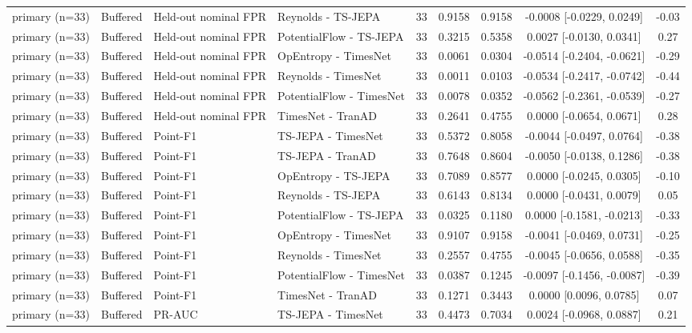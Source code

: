 \begin{table}[t]
\begin{tabular}{@{}llllccccc@{}}
primary (n=33) & Buffered & Held-out nominal FPR & Reynolds - TS-JEPA & 33 & 0.9158 & 0.9158 & -0.0008 [-0.0229, 0.0249] & -0.03 \\
primary (n=33) & Buffered & Held-out nominal FPR & PotentialFlow - TS-JEPA & 33 & 0.3215 & 0.5358 & 0.0027 [-0.0130, 0.0341] & 0.27 \\
primary (n=33) & Buffered & Held-out nominal FPR & OpEntropy - TimesNet & 33 & 0.0061 & 0.0304 & -0.0514 [-0.2404, -0.0621] & -0.29 \\
primary (n=33) & Buffered & Held-out nominal FPR & Reynolds - TimesNet & 33 & 0.0011 & 0.0103 & -0.0534 [-0.2417, -0.0742] & -0.44 \\
primary (n=33) & Buffered & Held-out nominal FPR & PotentialFlow - TimesNet & 33 & 0.0078 & 0.0352 & -0.0562 [-0.2361, -0.0539] & -0.27 \\
primary (n=33) & Buffered & Held-out nominal FPR & TimesNet - TranAD & 33 & 0.2641 & 0.4755 & 0.0000 [-0.0654, 0.0671] & 0.28 \\
primary (n=33) & Buffered & Point-F1 & TS-JEPA - TimesNet & 33 & 0.5372 & 0.8058 & -0.0044 [-0.0497, 0.0764] & -0.38 \\
primary (n=33) & Buffered & Point-F1 & TS-JEPA - TranAD & 33 & 0.7648 & 0.8604 & -0.0050 [-0.0138, 0.1286] & -0.38 \\
primary (n=33) & Buffered & Point-F1 & OpEntropy - TS-JEPA & 33 & 0.7089 & 0.8577 & 0.0000 [-0.0245, 0.0305] & -0.10 \\
primary (n=33) & Buffered & Point-F1 & Reynolds - TS-JEPA & 33 & 0.6143 & 0.8134 & 0.0000 [-0.0431, 0.0079] & 0.05 \\
primary (n=33) & Buffered & Point-F1 & PotentialFlow - TS-JEPA & 33 & 0.0325 & 0.1180 & 0.0000 [-0.1581, -0.0213] & -0.33 \\
primary (n=33) & Buffered & Point-F1 & OpEntropy - TimesNet & 33 & 0.9107 & 0.9158 & -0.0041 [-0.0469, 0.0731] & -0.25 \\
primary (n=33) & Buffered & Point-F1 & Reynolds - TimesNet & 33 & 0.2557 & 0.4755 & -0.0045 [-0.0656, 0.0588] & -0.35 \\
primary (n=33) & Buffered & Point-F1 & PotentialFlow - TimesNet & 33 & 0.0387 & 0.1245 & -0.0097 [-0.1456, -0.0087] & -0.39 \\
primary (n=33) & Buffered & Point-F1 & TimesNet - TranAD & 33 & 0.1271 & 0.3443 & 0.0000 [0.0096, 0.0785] & 0.07 \\
primary (n=33) & Buffered & PR-AUC & TS-JEPA - TimesNet & 33 & 0.4473 & 0.7034 & 0.0024 [-0.0968, 0.0887] & 0.21 \\

\end{tabular}
\end{table}
